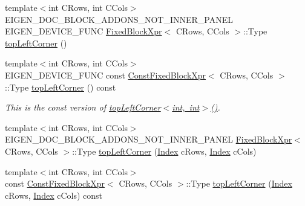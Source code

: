 \begin{DoxyCompactItemize}
{\footnotesize template$<$int C\+Rows, int C\+Cols$>$ }\\E\+I\+G\+E\+N\+\_\+\+D\+O\+C\+\_\+\+B\+L\+O\+C\+K\+\_\+\+A\+D\+D\+O\+N\+S\+\_\+\+N\+O\+T\+\_\+\+I\+N\+N\+E\+R\+\_\+\+P\+A\+N\+EL E\+I\+G\+E\+N\+\_\+\+D\+E\+V\+I\+C\+E\+\_\+\+F\+U\+NC \mbox{\hyperlink{struct_eigen_1_1_sparse_matrix_base_1_1_fixed_block_xpr}{Fixed\+Block\+Xpr}}$<$ C\+Rows, C\+Cols $>$\+::Type \mbox{\hyperlink{class_eigen_1_1_sparse_matrix_base_a15819a901d677053cff381a3b7c6739b}{top\+Left\+Corner}} ()
\item 
\mbox{\label{class_eigen_1_1_sparse_matrix_base_a61a62a5375ec7c8d1584b880aaa9428d}} 
{\footnotesize template$<$int C\+Rows, int C\+Cols$>$ }\\E\+I\+G\+E\+N\+\_\+\+D\+E\+V\+I\+C\+E\+\_\+\+F\+U\+NC const \mbox{\hyperlink{struct_eigen_1_1_sparse_matrix_base_1_1_const_fixed_block_xpr}{Const\+Fixed\+Block\+Xpr}}$<$ C\+Rows, C\+Cols $>$\+::Type \mbox{\hyperlink{class_eigen_1_1_sparse_matrix_base_a61a62a5375ec7c8d1584b880aaa9428d}{top\+Left\+Corner}} () const
\begin{DoxyCompactList}\small\item\em This is the const version of \mbox{\hyperlink{class_eigen_1_1_sparse_matrix_base_a15819a901d677053cff381a3b7c6739b}{top\+Left\+Corner$<$int, int$>$()}}. \end{DoxyCompactList}\item 
{\footnotesize template$<$int C\+Rows, int C\+Cols$>$ }\\E\+I\+G\+E\+N\+\_\+\+D\+O\+C\+\_\+\+B\+L\+O\+C\+K\+\_\+\+A\+D\+D\+O\+N\+S\+\_\+\+N\+O\+T\+\_\+\+I\+N\+N\+E\+R\+\_\+\+P\+A\+N\+EL \mbox{\hyperlink{struct_eigen_1_1_sparse_matrix_base_1_1_fixed_block_xpr}{Fixed\+Block\+Xpr}}$<$ C\+Rows, C\+Cols $>$\+::Type \mbox{\hyperlink{class_eigen_1_1_sparse_matrix_base_a7ca58a7a4a44dcadc519eb67f9611efa}{top\+Left\+Corner}} (\mbox{\hyperlink{struct_eigen_1_1_eigen_base_a554f30542cc2316add4b1ea0a492ff02}{Index}} c\+Rows, \mbox{\hyperlink{struct_eigen_1_1_eigen_base_a554f30542cc2316add4b1ea0a492ff02}{Index}} c\+Cols)
\item 
\mbox{\label{class_eigen_1_1_sparse_matrix_base_a4d2a17b67327925dc9dab29694f48433}} 
{\footnotesize template$<$int C\+Rows, int C\+Cols$>$ }\\const \mbox{\hyperlink{struct_eigen_1_1_sparse_matrix_base_1_1_const_fixed_block_xpr}{Const\+Fixed\+Block\+Xpr}}$<$ C\+Rows, C\+Cols $>$\+::Type \mbox{\hyperlink{class_eigen_1_1_sparse_matrix_base_a4d2a17b67327925dc9dab29694f48433}{top\+Left\+Corner}} (\mbox{\hyperlink{struct_eigen_1_1_eigen_base_a554f30542cc2316add4b1ea0a492ff02}{Index}} c\+Rows, \mbox{\hyperlink{struct_eigen_1_1_eigen_base_a554f30542cc2316add4b1ea0a492ff02}{Index}} c\+Cols) const

\end{DoxyCompactItemize}
